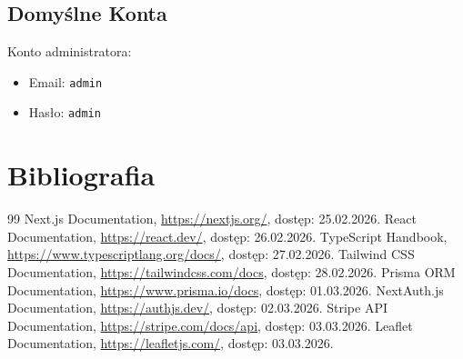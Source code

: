 \documentclass[12pt,a4paper,utf-8]{article}
\begin{document}
\subsection{Domyślne Konta}

Konto administratora:
\begin{itemize}
    \item Email: \texttt{admin}
    \item Hasło: \texttt{admin}
\end{itemize}

\newpage

\section{Bibliografia}

\renewcommand{\refname}{}
\begin{thebibliography}{99}
     Next.js Documentation, \url{https://nextjs.org/}, dostęp: 25.02.2026.
     React Documentation, \url{https://react.dev/}, dostęp: 26.02.2026.
     TypeScript Handbook, \url{https://www.typescriptlang.org/docs/}, dostęp: 27.02.2026.
     Tailwind CSS Documentation, \url{https://tailwindcss.com/docs}, dostęp: 28.02.2026.
     Prisma ORM Documentation, \url{https://www.prisma.io/docs}, dostęp: 01.03.2026.
     NextAuth.js Documentation, \url{https://authjs.dev/}, dostęp: 02.03.2026.
     Stripe API Documentation, \url{https://stripe.com/docs/api}, dostęp: 03.03.2026.
     Leaflet Documentation, \url{https://leafletjs.com/}, dostęp: 03.03.2026.
\end{thebibliography}

\newpage
\end{document}

